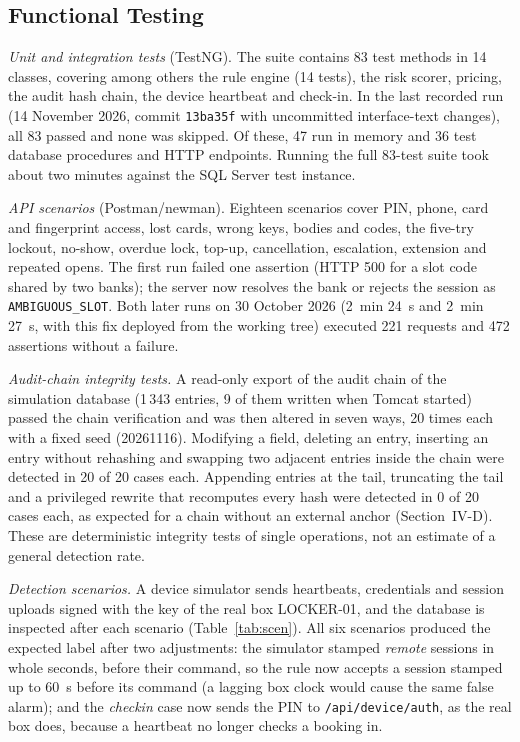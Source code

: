 \documentclass[journal,onecolumn]{IEEEtran}
\begin{document}
\subsection{Functional Testing}
\label{sec:functional}

\textit{Unit and integration tests} (TestNG). The suite contains 83 test methods in 14 classes, covering among others the
rule engine (14 tests), the risk scorer, pricing, the audit hash chain, the device heartbeat and check-in. In the last recorded run (14 November
2026, commit \texttt{13ba35f} with uncommitted interface-text changes), all 83 passed and none was skipped. Of these, 47 run in memory and 36
test database procedures and HTTP endpoints. Running the full 83-test suite took about two minutes
against the SQL Server test instance.

\textit{API scenarios} (Postman/newman). Eighteen scenarios cover PIN, phone, card and fingerprint access, lost cards,
wrong keys, bodies and codes, the five-try lockout, no-show, overdue lock, top-up, cancellation, escalation, extension
and repeated opens. The first run failed one assertion (HTTP 500 for a slot code shared by two banks); the server now resolves the bank
or rejects the session as \texttt{AMBIGUOUS\_SLOT}. Both later runs on 30 October
2026 (2~min 24~s and 2~min 27~s, with this fix deployed from the working tree) executed 221 requests and 472
assertions without a failure.

\textit{Audit-chain integrity tests.} A read-only export of the audit chain of the simulation database (1\,343
entries, 9 of them written when Tomcat started) passed the chain verification and was then altered in seven ways, 20
times each with a fixed seed (20261116). Modifying a field, deleting an entry, inserting an entry without rehashing
and swapping two adjacent entries inside the chain were detected in 20 of 20 cases each. Appending entries at the
tail, truncating the tail and a privileged rewrite that recomputes every hash were detected in 0 of 20 cases each, as
expected for a chain without an external anchor (Section~IV-D). These are deterministic integrity tests of single
operations, not an estimate of a general detection rate.

\textit{Detection scenarios.} A device simulator sends heartbeats, credentials and session uploads signed with the key
of the real box LOCKER-01, and the database is inspected after each scenario (Table~\ref{tab:scen}). All six scenarios
produced the expected label after two adjustments: the simulator stamped \emph{remote} sessions in whole seconds,
before their command, so the rule now accepts a session stamped up to 60~s before its command (a lagging box clock
would cause the same false alarm); and the \emph{checkin} case now sends the PIN to \texttt{/api/device/auth}, as
the real box does, because a heartbeat no longer checks a booking in.
\end{document}
